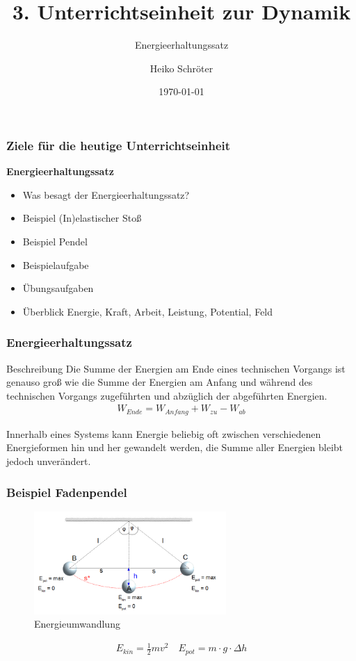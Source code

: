\documentclass[12pt,oneside]{scrartcl}
\title{3. Unterrichtseinheit zur Dynamik}
\subtitle{Energieerhaltungssatz}
\author{Heiko Schröter}
\date{\today}
\begin{document}
\frame{\titlepage}

\frame
{
  \frametitle{Ziele für die heutige Unterrichtseinheit}
  \textbf{Energieerhaltungssatz}
  \begin{itemize}
	\item Was besagt der Energieerhaltungssatz?
	\item Beispiel (In)elastischer Stoß
	\item Beispiel Pendel
	\item Beispielaufgabe
	\item Übungsaufgaben
	\item Überblick Energie, Kraft, Arbeit, Leistung, Potential, Feld
  \end{itemize}
}

\frame
{
  \frametitle{Energieerhaltungssatz}
\begin{block}{Beschreibung}
Die Summe der Energien am Ende eines technischen Vorgangs ist genauso groß wie die Summe der Energien am Anfang und während des technischen Vorgangs zugeführten und abzüglich der abgeführten Energien.
\begin{align*}
W_{Ende}=W_{Anfang}+W_{zu}-W_{ab}
\end{align*}
\end{block}
Innerhalb eines Systems kann Energie beliebig oft zwischen verschiedenen Energieformen hin und her gewandelt werden, die Summe aller Energien bleibt jedoch unverändert.
}

\frame
{
  \frametitle{Beispiel Fadenpendel}
      \begin{figure}
	  \includegraphics[width=0.65\textwidth]{Fadenpendel}
	  \vspace{-3mm}
	  \caption{Energieumwandlung}
   \end{figure}
  \begin{block}{}
	\begin{align*}
	E_{kin}=\frac{1}{2}mv^2\quad
	E_{pot}=m\cdot g\cdot \Delta h
	\end{align*}
  \end{block}
}
\end{document}

